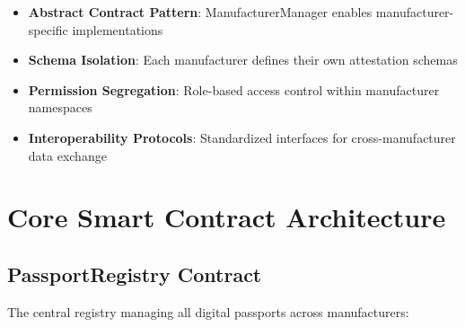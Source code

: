 \documentclass[11pt,a4paper]{article}
\begin{document}
\begin{itemize}[leftmargin=0.5cm]
    \item \textbf{Abstract Contract Pattern}: ManufacturerManager enables manufacturer-specific implementations
    \item \textbf{Schema Isolation}: Each manufacturer defines their own attestation schemas
    \item \textbf{Permission Segregation}: Role-based access control within manufacturer namespaces
    \item \textbf{Interoperability Protocols}: Standardized interfaces for cross-manufacturer data exchange
\end{itemize}

\section{Core Smart Contract Architecture}

\subsection{PassportRegistry Contract}

The central registry managing all digital passports across manufacturers:
\end{document}
